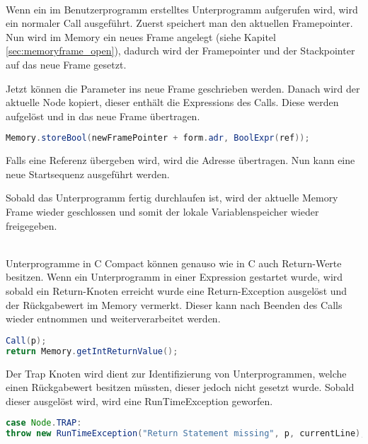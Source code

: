 \\

Wenn ein im Benutzerprogramm erstelltes Unterprogramm aufgerufen wird, wird ein normaler Call ausgeführt. Zuerst speichert man den aktuellen Framepointer. Nun wird im Memory ein neues Frame angelegt (siehe Kapitel \ref{sec:memoryframe_open}), dadurch wird der Framepointer und der Stackpointer auf das neue Frame gesetzt.

Jetzt können die Parameter ins neue Frame geschrieben werden. Danach wird der aktuelle Node kopiert, dieser enthält die Expressions des Calls. Diese werden aufgelöst und in das neue Frame übertragen. 
\begin{lstlisting}[language=JAVA]
Memory.storeBool(newFramePointer + form.adr, BoolExpr(ref));
\end{lstlisting}
Falls eine Referenz übergeben wird, wird die Adresse übertragen. Nun kann eine neue Startsequenz ausgeführt werden.

Sobald das Unterprogramm fertig durchlaufen ist, wird der aktuelle Memory Frame wieder geschlossen und somit der lokale Variablenspeicher wieder freigegeben.

\\
Unterprogramme in C Compact können genauso wie in C auch Return-Werte besitzen. Wenn ein Unterprogramm in einer Expression gestartet wurde, wird sobald ein Return-Knoten erreicht wurde eine Return-Exception ausgelöst und der Rückgabewert im Memory vermerkt. Dieser kann nach Beenden des Calls wieder entnommen und weiterverarbeitet werden.
\begin{lstlisting}[language=JAVA]
Call(p);
return Memory.getIntReturnValue();	
\end{lstlisting}

Der Trap Knoten wird dient zur Identifizierung von Unterprogrammen, welche einen Rückgabewert besitzen müssten, dieser jedoch nicht gesetzt wurde. Sobald dieser ausgelöst wird, wird eine RunTimeException geworfen.
\begin{lstlisting}[language=JAVA]
case Node.TRAP:
throw new RunTimeException("Return Statement missing", p, currentLine); 
\end{lstlisting}
